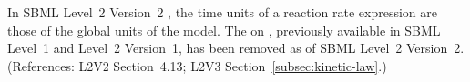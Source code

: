 In SBML Level~2 Version~2 , the time units of a reaction
rate expression are those of the global  units of the model.  The
  on \KineticLaw, previously available in SBML
Level~1 and Level~2 Version~1, has been removed as of SBML Level~2
Version~2.  (References: L2V2 Section~4.13; L2V3 Section~\ref{subsec:kinetic-law}.)
